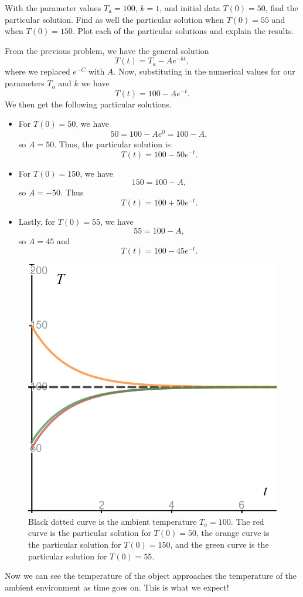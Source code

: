 \documentclass[12pt]{article} %
\begin{document}
\newpage

\begin{problem}
    With the parameter values $T_a=100$, $k=1$, and initial data $T(0)=50$, find the particular solution.  Find as well the particular solution when $T(0)=55$ and when $T(0)=150$. Plot each of the particular solutions and explain the results.
\end{problem}
\begin{solution}
From the previous problem, we have the general solution
\[
T(t) = T_a - Ae^{-kt},
\]
where we replaced $e^{-C}$ with $A$.  Now, substituting in the numerical values for our parameters $T_a$ and $k$ we have
\[
T(t) = 100 - Ae^{-t}.
\]
We then get the following particular solutions.
\begin{itemize}
    \item For $T(0)=50$, we have
    \[
    50 = 100 - Ae^{0} = 100 - A,
    \]
    so $A=50$.  Thus, the particular solution is
    \[
    T(t) = 100-50e^{-t}.
    \]
    \item For $T(0)=150$, we have
    \[
    150 = 100 - A,
    \]
    so $A=-50$.  Thus
    \[
    T(t) = 100+50e^{-t}.
    \]
    \item Lastly, for $T(0)=55$, we have
    \[
    55 = 100-A,
    \]
    so $A=45$ and
    \[
    T(t) = 100-45e^{-t}.
    \]
\end{itemize}

\begin{figure}[H]
    \centering
    \includegraphics[width=.6\textwidth]{newtons_cooling.png}
    \caption{Black dotted curve is the ambient temperature $T_a=100$. The red curve is the particular solution for $T(0)=50$, the orange curve is the particular solution for $T(0)=150$, and the green curve is the particular solution for $T(0)=55$.}
\end{figure}
Now we can see the temperature of the object approaches the temperature of the ambient environment as time goes on. This is what we expect!
\end{solution}
\end{document}
